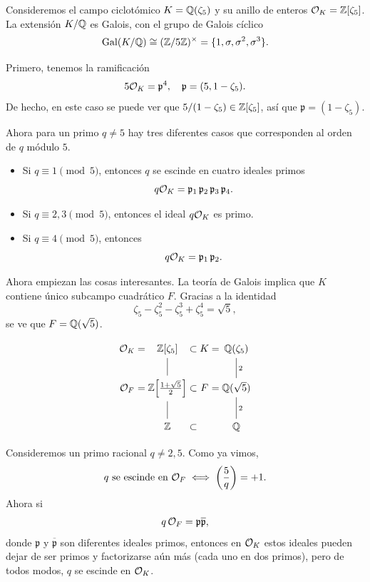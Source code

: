 \begin{ejemplo}
  Consideremos el campo ciclotómico $K = \mathbb{Q} (\zeta_5)$ y su anillo de enteros
  $\mathcal{O}_K = \mathbb{Z} [\zeta_5]$. La extensión $K/\mathbb{Q}$ es Galois, con el grupo de Galois
  cíclico
  $$\operatorname{Gal} (K/\mathbb{Q}) \cong (\mathbb{Z}/5\mathbb{Z})^\times = \{ 1, \sigma, \sigma^2, \sigma^3 \}.$$

  Primero, tenemos la ramificación
  $$5\mathcal{O}_K = \mathfrak{p}^4, \quad \mathfrak{p} = (5, 1 - \zeta_5).$$
  De hecho, en este caso se puede ver que $5/(1-\zeta_5) \in \mathbb{Z} [\zeta_5]$,
  así que $\mathfrak{p} = (1-\zeta_5)$.

  Ahora para un primo $q \ne 5$ hay tres diferentes casos que corresponden
  al orden de $q$ módulo $5$.

  \begin{itemize}
  \item Si $q \equiv 1 \pmod{5}$, entonces $q$ se escinde en cuatro ideales
    primos
    $$q \mathcal{O}_K = \mathfrak{p}_1\,\mathfrak{p}_2\,\mathfrak{p}_3\,\mathfrak{p}_4.$$

  \item Si $q \equiv 2,3 \pmod{5}$, entonces el ideal $q \mathcal{O}_K$ es primo.

  \item Si $q \equiv 4 \pmod{5}$, entonces
    $$q \mathcal{O}_K = \mathfrak{p}_1 \, \mathfrak{p}_2.$$
  \end{itemize}

  Ahora empiezan las cosas interesantes. La teoría de Galois implica que
  $K$ contiene único subcampo cuadrático $F$. Gracias a la identidad
  $$\zeta_5 - \zeta_5^2 - \zeta_5^3 + \zeta_5^4 = \sqrt{5},$$
  se ve que $F = \mathbb{Q} (\sqrt{5})$.

  \[ \begin{tikzcd}
    \O_K &[-3em] = &[-3em] \ZZ [\zeta_5] \ar[-]{d} &[-3em] \subset &[-3em] K &[-3em] = &[-3em] \QQ (\zeta_5) \ar[-]{d}{2} \\
    \O_F & = & \ZZ \Bigl[\frac{1+\sqrt{5}}{2}\Bigr] \ar[-]{d} & \subset & F & = & \QQ (\sqrt{5}) \ar[-]{d}{2} \\
    && \ZZ & \subset &&& \QQ
  \end{tikzcd} \]

  Consideremos un primo racional $q \ne 2,5$. Como ya vimos,
  $$q\text{ se escinde en } \mathcal{O}_F \iff \left(\frac{5}{q}\right) = +1.$$
  Ahora si
  $$q\,\mathcal{O}_F = \mathfrak{p} \overline{\mathfrak{p}},$$
  donde $\mathfrak{p}$ y $\overline{\mathfrak{p}}$ son diferentes ideales
  primos, entonces en $\mathcal{O}_K$ estos ideales pueden dejar de ser primos y
  factorizarse aún más (cada uno en dos primos), pero de todos modos, $q$ se
  escinde en $\mathcal{O}_K$.


\end{ejemplo}
